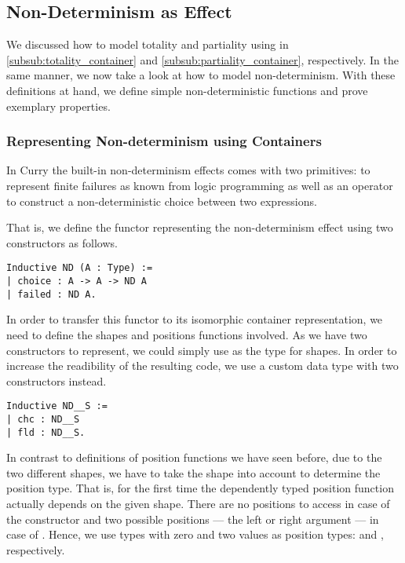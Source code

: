 \subsection{Non-Determinism as Effect}

We discussed how to model totality and partiality using  in \autoref{subsub:totality_container} and \autoref{subsub:partiality_container}, respectively.
In the same manner, we now take a look at how to model non-determinism.
With these definitions at hand, we define simple non-deterministic functions and prove exemplary properties.

\subsubsection{Representing Non-determinism using Containers}
In Curry the built-in non-determinism effects comes with two primitives:  to represent finite failures as known from logic programming as well as an operator  to construct a non-deterministic choice between two expressions.

That is, we define the functor representing the non-determinism effect using two constructors as follows. 

\begin{verbatim}
Inductive ND (A : Type) :=
| choice : A -> A -> ND A
| failed : ND A.
\end{verbatim}

In order to transfer this functor to its isomorphic container representation, we need to define the shapes and positions functions involved.
As we have two constructors to represent, we could simply use  as the type for shapes.
In order to increase the readibility of the resulting code, we use a custom data type with two constructors instead.

\begin{verbatim}
Inductive ND__S :=
| chc : ND__S
| fld : ND__S.
\end{verbatim}

In contrast to definitions of position functions we have seen before, due to the two different shapes, we have to take the shape into account to determine the position type.
That is, for the first time the dependently typed position function actually depends on the given shape.
There are no positions to access in case of the  constructor and two possible positions --- the left or right argument --- in case of .
Hence, we use types with zero and two values as position types:  and , respectively.


